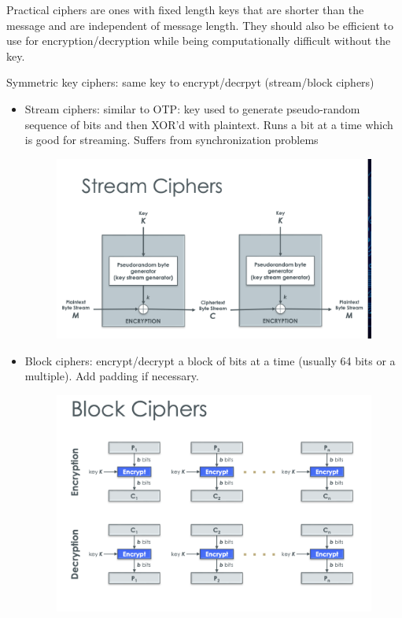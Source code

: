 \documentclass[../notes.tex]{subfiles}
\begin{document}
Practical ciphers are ones with fixed length keys that are shorter than the message and are independent of message length. They should also be efficient to use for encryption/decryption while being computationally difficult without the key.

\begin{definition}
    Symmetric key ciphers: same key to encrypt/decrpyt (stream/block ciphers)

    \begin{itemize}
        \item Stream ciphers: similar to OTP: key used to generate pseudo-random sequence of bits and then XOR'd with plaintext. Runs a bit at a time which is good for streaming. Suffers from synchronization problems

            \begin{figure}[H]
                \centering
                \includegraphics[width=0.8\linewidth]{img/image_2023-01-30-19-43-53.png}
            \end{figure}
        \item Block ciphers: encrypt/decrypt a block of bits at a time (usually 64 bits or a multiple). Add padding if necessary.

            \begin{figure}[H]
                \centering
                \includegraphics[width=0.8\linewidth]{img/image_2023-01-30-19-44-04.png}
            \end{figure}
    \end{itemize}


\end{definition}
\end{document}

